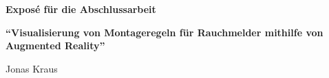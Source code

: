 \begin{center}
\large\textbf{Expos\'{e} f\"ur die Abschlussarbeit}

\Large\textbf{``Visualisierung von Montageregeln f\"ur Rauchmelder mithilfe von Augmented Reality''}

\vspace{2ex}
\normalsize
Jonas Kraus
\end{center}